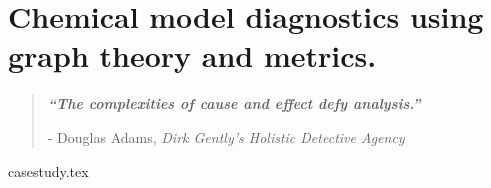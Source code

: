 

\chapter{ Chemical model diagnostics using graph theory and metrics.  }


\blankpage
\restoregeometry
\vspace*{0.15\paperheight}


\begin{center}
\begin{quotation}
  \large{\emph{\textbf{``The complexities of cause and effect defy analysis.''} }  }  \\
  \begin{flushright}
  - Douglas Adams, \textit{Dirk Gently's Holistic Detective Agency}
  \end{flushright}
 \end{quotation}
\end{center}
\doublespacing
\newpage

% 
{casestudy.tex}

\chapterbib






